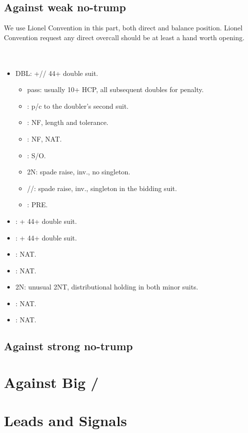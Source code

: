\documentclass[12pt,twoside,a5paper]{report}%
\begin{document}
	\section*{Against weak no-trump}
		We use Lionel Convention in this part, both direct and balance position. Lionel Convention request any direct overcall should be at least a hand worth opening.\\
		\\
		\\
		\begin{itemize}
		\renewcommand{\labelitemi}{--}
			\item DBL: \sp{}+\he{}/\di{}/\cl{} 44+ double suit.
				\begin{itemize}
				\renewcommand{\labelitemi}{--}
					\item pass: usually 10+ HCP, all subsequent doubles for penalty.
					\item {}: p/c to the doubler's second suit.
					\item {}: NF, \di{} length and \he{} tolerance.
					\item {}: NF, NAT.
					\item {}: S/O.
					\item 2N: spade raise, inv., no singleton.
					\item {}/\di{}/\he{}: spade raise, inv., singleton in the bidding suit.
					\item {}: PRE.
				\end{itemize}
			\item {}: \he{}+\cl{} 44+ double suit.
			\item {}: \he{}+\di{} 44+ double suit.
			\item {}: NAT.
			\item {}: NAT.
			\item 2N: unusual 2NT, distributional holding in both minor suits.
			\item {}: NAT.
			\item {}: NAT.
		\end{itemize}
		
	\section*{Against strong no-trump}
\chapter*{Against Big \cl{}/\di{}}
\chapter*{Leads and Signals}
\end{document}
